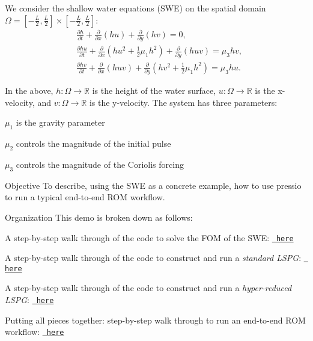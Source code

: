 We consider the shallow water equations (SWE) on the spatial domain $\Omega = [-\frac{L}{2},\frac{L}{2}] \times [-\frac{L}{2},\frac{L}{2}]$\+: \[ \begin{split} &\frac{\partial h}{\partial t} + \frac{\partial}{\partial x }( h u) + \frac{\partial}{\partial y }( h v) = 0,\\ &\frac{\partial h u}{\partial t} + \frac{\partial}{\partial x} (h u^2 + \frac{1}{2} \mu_1 h^2) + \frac{\partial}{\partial y }( h u v) = \mu_3 hv,\\ &\frac{\partial h v}{\partial t} + \frac{\partial}{\partial x} (h u v) + \frac{\partial}{\partial y }( h v^2 + \frac{1}{2} \mu_1 h^2) = \mu_3 hu. \end{split} \]

In the above, $h : \Omega \rightarrow \mathbb{R}$ is the height of the water surface, $u : \Omega \rightarrow \mathbb{R}$ is the x-\/velocity, and $v : \Omega \rightarrow \mathbb{R}$ is the y-\/velocity. The system has three parameters\+:
\begin{DoxyItemize}
\item $\mu_1$ is the gravity parameter
\item $\mu_2$ controls the magnitude of the initial pulse
\item $\mu_3$ controls the magnitude of the Coriolis forcing
\end{DoxyItemize}





\begin{DoxyParagraph}{Objective}
To describe, using the SWE as a concrete example, how to use pressio to run a typical end-\/to-\/end ROM workflow.
\end{DoxyParagraph}


\begin{DoxyParagraph}{Organization}
This demo is broken down as follows\+:
\begin{DoxyEnumerate}
\item A step-\/by-\/step walk through of the code to solve the FOM of the SWE\+: \href{./md_pages_swe_fom.html}{\texttt{ here}}
\item A step-\/by-\/step walk through of the code to construct and run a {\itshape standard LSPG}\+: \href{./md_pages_swe_lspg.html}{\texttt{ here}}
\item A step-\/by-\/step walk through of the code to construct and run a {\itshape hyper-\/reduced LSPG}\+: \href{./md_pages_swe_hrlspg.html}{\texttt{ here}}
\item Putting all pieces together\+: step-\/by-\/step walk through to run an end-\/to-\/end ROM workflow\+: \href{./md_pages_swe_endtoend.html}{\texttt{ here}} 
\end{DoxyEnumerate}
\end{DoxyParagraph}
